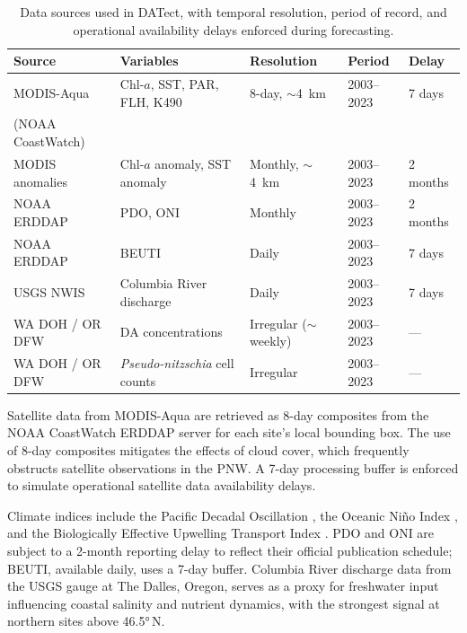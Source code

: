 \documentclass[preprint,12pt,authoryear]{elsarticle}
\begin{document}
\begin{table}[!htbp]
\centering
\caption{Data sources used in DATect, with temporal resolution, period of record, and operational availability delays enforced during forecasting.}
\label{tab:data-sources}
\small
\begin{tabular}{@{}p{3.2cm}p{3.5cm}lll@{}}
\toprule
\textbf{Source} & \textbf{Variables} & \textbf{Resolution} & \textbf{Period} & \textbf{Delay} \\
\midrule
MODIS-Aqua & Chl-$a$, SST, PAR, FLH, K490 & 8-day, $\sim$\SI{4}{\kilo\meter} & 2003--2023 & 7 days \\
(NOAA CoastWatch) & & & & \\
\addlinespace
MODIS anomalies & Chl-$a$ anomaly, SST anomaly & Monthly, $\sim$\SI{4}{\kilo\meter} & 2003--2023 & 2 months \\
\addlinespace
NOAA ERDDAP & PDO, ONI & Monthly & 2003--2023 & 2 months \\
\addlinespace
NOAA ERDDAP & BEUTI & Daily & 2003--2023 & 7 days \\
\addlinespace
USGS NWIS & Columbia River discharge & Daily & 2003--2023 & 7 days \\
\addlinespace
WA DOH / OR DFW & DA concentrations & Irregular ($\sim$weekly) & 2003--2023 & --- \\
\addlinespace
WA DOH / OR DFW & \textit{Pseudo-nitzschia} cell counts & Irregular & 2003--2023 & --- \\
\bottomrule
\end{tabular}
\end{table}

Satellite data from MODIS-Aqua \citep{NASA2002} are retrieved as 8-day composites from the NOAA CoastWatch ERDDAP server for each site's local bounding box. The use of 8-day composites mitigates the effects of cloud cover, which frequently obstructs satellite observations in the PNW. A 7-day processing buffer is enforced to simulate operational satellite data availability delays.

Climate indices include the Pacific Decadal Oscillation \citep[PDO;][]{Mantua1997}, the Oceanic Ni\~no Index \citep[ONI;][]{Wolter2011}, and the Biologically Effective Upwelling Transport Index \citep[BEUTI;][]{Jacox2018}. PDO and ONI are subject to a 2-month reporting delay to reflect their official publication schedule; BEUTI, available daily, uses a 7-day buffer. Columbia River discharge data from the USGS gauge at The Dalles, Oregon, serves as a proxy for freshwater input influencing coastal salinity and nutrient dynamics, with the strongest signal at northern sites above \ang{46.5}\,N.
\end{document}
